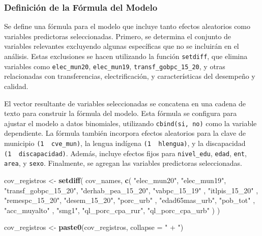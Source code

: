 \documentclass[
  12pt,
]{book}
\newenvironment{Shaded}{\begin{snugshade}}{\end{snugshade}}
\newcommand{\AttributeTok}[1]{\textcolor[rgb]{0.13,0.29,0.53}{#1}}
\newcommand{\FunctionTok}[1]{\textcolor[rgb]{0.13,0.29,0.53}{\textbf{#1}}}
\newcommand{\NormalTok}[1]{#1}
\newcommand{\OtherTok}[1]{\textcolor[rgb]{0.56,0.35,0.01}{#1}}
\newcommand{\StringTok}[1]{\textcolor[rgb]{0.31,0.60,0.02}{#1}}
\begin{document}
\hypertarget{definiciuxf3n-de-la-fuxf3rmula-del-modelo}{%
\subsubsection*{Definición de la Fórmula del Modelo}\label{definiciuxf3n-de-la-fuxf3rmula-del-modelo}}

Se define una fórmula para el modelo que incluye tanto efectos aleatorios como variables predictoras seleccionadas. Primero, se determina el conjunto de variables relevantes excluyendo algunas específicas que no se incluirán en el análisis. Estas exclusiones se hacen utilizando la función \texttt{setdiff}, que elimina variables como \texttt{elec\_mun20}, \texttt{elec\_mun19}, \texttt{transf\_gobpc\_15\_20}, y otras relacionadas con transferencias, electrificación, y características del desempeño y calidad.

El vector resultante de variables seleccionadas se concatena en una cadena de texto para construir la fórmula del modelo. Esta fórmula se configura para ajustar el modelo a datos binomiales, utilizando \texttt{cbind(si,\ no)} como la variable dependiente. La fórmula también incorpora efectos aleatorios para la clave de municipio \texttt{(1\ \textbar{}\ cve\_mun)}, la lengua indígena \texttt{(1\ \textbar{}\ hlengua)}, y la discapacidad \texttt{(1\ \textbar{}\ discapacidad)}. Además, incluye efectos fijos para \texttt{nivel\_edu}, \texttt{edad}, \texttt{ent}, \texttt{area}, y \texttt{sexo}. Finalmente, se agregan las variables predictoras seleccionadas.

\begin{Shaded}
\begin{Highlighting}[]
\NormalTok{cov\_registros }\OtherTok{\textless{}{-}}
  \FunctionTok{setdiff}\NormalTok{(}
\NormalTok{    cov\_names,}
    \FunctionTok{c}\NormalTok{(}
      \StringTok{"elec\_mun20"}\NormalTok{,}
      \StringTok{"elec\_mun19"}\NormalTok{,}
      \StringTok{"transf\_gobpc\_15\_20"}\NormalTok{,}
      \StringTok{"derhab\_pea\_15\_20"}\NormalTok{,}
      \StringTok{"vabpc\_15\_19"}\NormalTok{ ,}
      \StringTok{"itlpis\_15\_20"}\NormalTok{  ,}
      \StringTok{"remespc\_15\_20"}\NormalTok{,}
      \StringTok{"desem\_15\_20"}\NormalTok{,}
      \StringTok{"porc\_urb"}\NormalTok{ ,  }
      \StringTok{"edad65mas\_urb"}\NormalTok{, }
      \StringTok{"pob\_tot"}\NormalTok{ ,}
      \StringTok{"acc\_muyalto"}\NormalTok{ ,}
      \StringTok{"smg1"}\NormalTok{,}
      \StringTok{"ql\_porc\_cpa\_rur"}\NormalTok{,}
      \StringTok{"ql\_porc\_cpa\_urb"}
\NormalTok{    )}
\NormalTok{  )}

\NormalTok{cov\_registros }\OtherTok{\textless{}{-}} \FunctionTok{paste0}\NormalTok{(cov\_registros, }\AttributeTok{collapse =} \StringTok{" + "}\NormalTok{)}
\end{Highlighting}
\end{Shaded}
\end{document}
